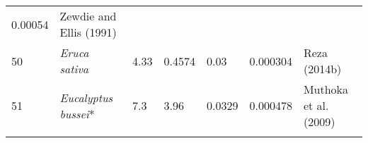 \documentclass[]{article}
\begin{document}
\begin{longtable}[]{@{}lllllll@{}}
\begin{minipage}[t]{0.08\columnwidth}
0.00054\strut
\end{minipage} & \begin{minipage}[t]{0.23\columnwidth}\raggedright
Zewdie and Ellis (1991)\strut
\end{minipage}\tabularnewline
\begin{minipage}[t]{0.05\columnwidth}\raggedright
50\strut
\end{minipage} & \begin{minipage}[t]{0.23\columnwidth}\raggedright
\emph{Eruca sativa}\strut
\end{minipage} & \begin{minipage}[t]{0.05\columnwidth}\raggedright
4.33\strut
\end{minipage} & \begin{minipage}[t]{0.08\columnwidth}\raggedright
0.4574\strut
\end{minipage} & \begin{minipage}[t]{0.08\columnwidth}\raggedright
0.03\strut
\end{minipage} & \begin{minipage}[t]{0.08\columnwidth}\raggedright
0.000304\strut
\end{minipage} & \begin{minipage}[t]{0.23\columnwidth}\raggedright
Reza (2014b)\strut
\end{minipage}\tabularnewline
\begin{minipage}[t]{0.05\columnwidth}\raggedright
51\strut
\end{minipage} & \begin{minipage}[t]{0.23\columnwidth}\raggedright
\emph{Eucalyptus bussei}*\strut
\end{minipage} & \begin{minipage}[t]{0.05\columnwidth}\raggedright
7.3\strut
\end{minipage} & \begin{minipage}[t]{0.08\columnwidth}\raggedright
3.96\strut
\end{minipage} & \begin{minipage}[t]{0.08\columnwidth}\raggedright
0.0329\strut
\end{minipage} & \begin{minipage}[t]{0.08\columnwidth}\raggedright
0.000478\strut
\end{minipage} & \begin{minipage}[t]{0.23\columnwidth}\raggedright
Muthoka et al. (2009)\strut
\end{minipage}\tabularnewline
\begin{minipage}[t]{0.05\columnwidth}\raggedright

\end{minipage}
\end{longtable}
\end{document}
